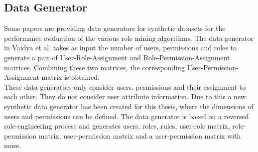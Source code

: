 \subsection{Data Generator}
\label{sec:dataGenerator}
Some papers are providing data generators for synthetic datasets for the performance evaluation of the various role mining algorithms. The data generator in Vaidya et al.\cite{Vaidya:2006:RMR:1180405.1180424} takes as input the number of users, permissions and roles to generate a pair of User-Role-Assignment and Role-Permission-Assignment matrices. Combining these two matrices, the corresponding User-Permission-Assignment matrix is obtained.\\
These data generators only consider users, permissions and their assignment to each other. They do not consider user attribute information. Due to this a new synthetic data generator has been created for this thesis, where the dimensions of users and permissions can be defined. The data generator is based on a reversed role-engineering process and generates users, roles, rules, user-role matrix, role-permission matrix, user-permission matrix and a user-permission matrix with noise.
